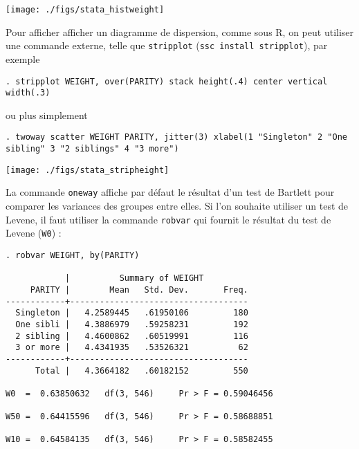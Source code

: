 \texttt{[image: ./figs/stata\_histweight]}

Pour afficher afficher un diagramme de dispersion, comme sous R, on peut
utiliser une commande externe, telle que \texttt{stripplot} (\texttt{ssc
  install stripplot}), par exemple
\begin{verbatim}
. stripplot WEIGHT, over(PARITY) stack height(.4) center vertical width(.3)
\end{verbatim}
ou plus simplement 
\begin{verbatim}
. twoway scatter WEIGHT PARITY, jitter(3) xlabel(1 "Singleton" 2 "One sibling" 3 "2 siblings" 4 "3 more")
\end{verbatim}

\texttt{[image: ./figs/stata\_stripheight]}

La commande \texttt{oneway} affiche par défaut le résultat d'un test de
Bartlett pour comparer les variances des groupes entre elles. Si l'on
souhaite utiliser un test de Levene, il faut utiliser la commande
\texttt{robvar} qui fournit le résultat du test de Levene (\texttt{W0}) :
\begin{verbatim}
. robvar WEIGHT, by(PARITY)

            |          Summary of WEIGHT
     PARITY |        Mean   Std. Dev.       Freq.
------------+------------------------------------
  Singleton |   4.2589445   .61950106         180
  One sibli |   4.3886979   .59258231         192
  2 sibling |   4.4600862   .60519991         116
  3 or more |   4.4341935   .53526321          62
------------+------------------------------------
      Total |   4.3664182   .60182152         550

W0  =  0.63850632   df(3, 546)     Pr > F = 0.59046456

W50 =  0.64415596   df(3, 546)     Pr > F = 0.58688851

W10 =  0.64584135   df(3, 546)     Pr > F = 0.58582455
\end{verbatim}

